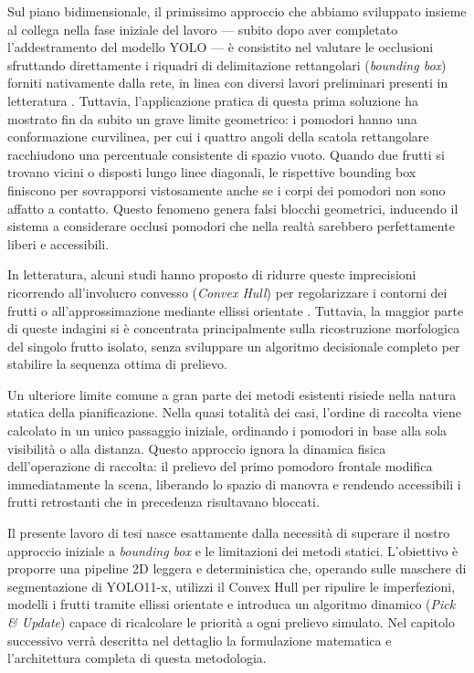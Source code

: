 Sul piano bidimensionale, il primissimo approccio che abbiamo sviluppato insieme al collega 
nella fase iniziale del lavoro — subito dopo aver completato l'addestramento del modello 
YOLO — è consistito nel valutare le occlusioni sfruttando direttamente i riquadri di 
delimitazione rettangolari (\textit{bounding box}) forniti nativamente dalla rete, 
in linea con diversi lavori preliminari presenti in letteratura \cite{chen2011practical}. 
Tuttavia, l'applicazione pratica di questa prima soluzione ha mostrato fin da subito un grave 
limite geometrico: i pomodori hanno una conformazione curvilinea, per cui i quattro angoli della 
scatola rettangolare racchiudono una percentuale consistente di spazio vuoto. Quando due 
frutti si trovano vicini o disposti lungo linee diagonali, le rispettive bounding box finiscono 
per sovrapporsi vistosamente anche se i corpi dei pomodori non sono affatto a contatto. 
Questo fenomeno genera falsi blocchi geometrici, inducendo il sistema a considerare occlusi 
pomodori che nella realtà sarebbero perfettamente liberi e accessibili.

In letteratura, alcuni studi hanno proposto di ridurre queste imprecisioni ricorrendo 
all'involucro convesso (\textit{Convex Hull}) per regolarizzare i contorni dei frutti 
\cite{changhui2017reconstruction} o all'approssimazione mediante ellissi orientate 
\cite{wang2024multifruit}. Tuttavia, la maggior parte di queste indagini si è concentrata 
principalmente sulla ricostruzione morfologica del singolo frutto isolato, senza sviluppare 
un algoritmo decisionale completo per stabilire la sequenza ottima di prelievo.

Un ulteriore limite comune a gran parte dei metodi esistenti risiede nella natura statica 
della pianificazione. Nella quasi totalità dei casi, l'ordine di raccolta viene calcolato 
in un unico passaggio iniziale, ordinando i pomodori in base alla sola visibilità o alla distanza. 
Questo approccio ignora la dinamica fisica dell'operazione di raccolta: il prelievo del primo 
pomodoro frontale modifica immediatamente la scena, liberando lo spazio di manovra e rendendo 
accessibili i frutti retrostanti che in precedenza risultavano bloccati.

Il presente lavoro di tesi nasce esattamente dalla necessità di superare il nostro approccio 
iniziale a \textit{bounding box} e le limitazioni dei metodi statici. L'obiettivo è proporre 
una pipeline 2D leggera e deterministica che, operando sulle maschere di segmentazione di 
YOLO11-x, utilizzi il Convex Hull per ripulire le imperfezioni, modelli i frutti tramite ellissi 
orientate e introduca un algoritmo dinamico (\textit{Pick \& Update}) capace di ricalcolare le 
priorità a ogni prelievo simulato. Nel capitolo successivo verrà descritta nel dettaglio 
la formulazione matematica e l'architettura completa di questa metodologia.


